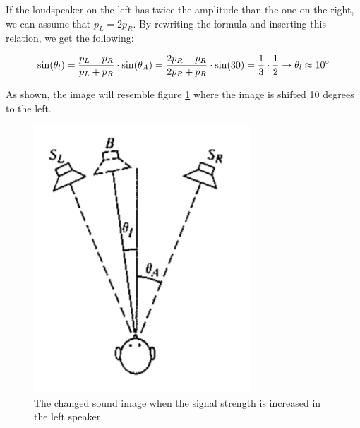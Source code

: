\documentclass{article}
\begin{document}
If the loudspeaker on the left has twice the amplitude than the one on the right, we can assume that $p_L=2p_R$. By rewriting the formula and inserting this relation, we get the following:

\begin{equation}
    \sin(\theta_l)=\frac{p_L - p_R}{p_L+p_R} \cdot \sin(\theta_A) = \frac{2p_R - p_R}{2p_R+p_R} \cdot \sin(30) = \frac{1}{3} \cdot \frac{1}{2} \rightarrow \theta_l \approx 10 \degree
\end{equation}

As shown, the image will resemble figure \ref{fig:img} where the image is shifted 10 degrees to the left.

\begin{figure}[H]
    \centering
    \includegraphics[scale=1.5]{figures/oving2_2.png}
    \caption{The changed sound image when the signal strength is increased in the left speaker.}
    \label{fig:img}
\end{figure}
\end{document}
